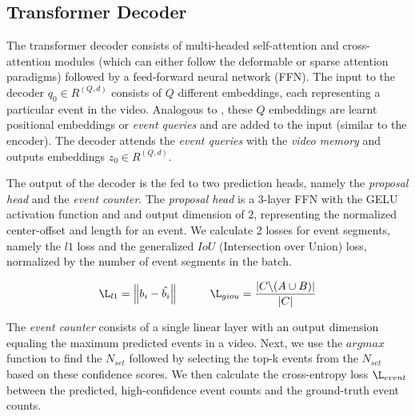 \subsection{Transformer Decoder}
The transformer decoder consists of multi-headed self-attention and cross-attention modules (which can either follow the deformable or sparse attention paradigms) followed by a feed-forward neural network (FFN). The input to the decoder $q_{0} \in R^{(Q , d)}$ consists of $Q$ different embeddings, each representing a particular event in the video. Analogous to \cite{carion2020detr}, these $Q$ embeddings are learnt positional embeddings or \textit{event queries} and are added to the input (similar to the encoder). The decoder attends the \textit{event queries} with the \textit{video memory} and outputs embeddings $z_{0} \in R^{(Q , d)}$.
\par The output of the decoder is the fed to two prediction heads, namely the \textit{proposal head} and the \textit{event counter}. The \textit{proposal head} is a 3-layer FFN with the GELU activation function and and output dimension of 2, representing the normalized center-offset and length for an event. We calculate 2 losses for event segments, namely the $l1$ loss and the generalized $IoU$ (Intersection over Union) loss, normalized by the number of event segments in the batch.

$$\L_{l1} =  \left \| b_{i} - \hat{b_{i}} \right \| \hspace{1cm} \L_{giou} = \frac{\left |C\symbol{92}(A\cup B)   \right |}{\left | C \right |} $$

\par The \textit{event counter} consists of a single linear layer with an output dimension equaling the maximum predicted events in a video. Next, we use the $argmax$ function to find the $N_{set}$ followed by selecting the top-k events from the $N_{set}$ based on these confidence scores. We then calculate the cross-entropy loss $\L_{event}$ between the predicted, high-confidence event counts and the ground-truth event counts.

